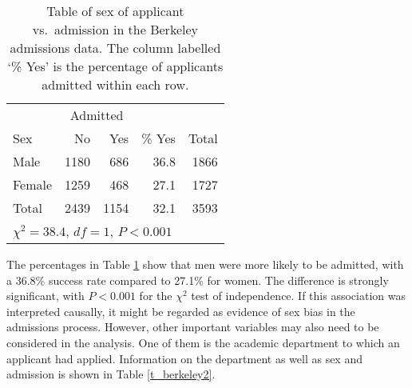 \begin{table}
\caption{Table of sex of applicant vs.\ admission in the Berkeley
admissions data. The
column labelled `\% Yes' is the percentage of applicants admitted within
each row.}
\label{t_berkeley1}
\begin{center}
\begin{tabular}{|l|rr|r|r|}\hline
& \multicolumn{2}{|c|}{Admitted} & & \\
Sex & No & Yes & \% Yes& Total \\ \hline
Male & 1180 &  686 & 36.8 & 1866 \\
Female & 1259 & 468 & 27.1 & 1727 \\ \hline
Total & 2439 & 1154 & 32.1 & 3593 \\
\hline
\multicolumn{5}{l}{{\small $\chi^{2}=38.4$, $df=1$, $P<0.001$}}
\end{tabular}
\end{center}

\end{table}

The percentages in Table \ref{t_berkeley1} show that men were more
likely to be admitted, with a 36.8\% success rate compared to 27.1\% for
women. The difference is strongly significant, with $P<0.001$ for the
$\chi^{2}$ test of independence. If this association was interpreted
causally, it might be regarded as evidence of sex bias in the admissions
process. However, other important variables may also need to be
considered in the analysis. One of them is the academic department
to which an applicant had applied. Information on the department as well
as sex and admission is shown in Table \ref{t_berkeley2}.

